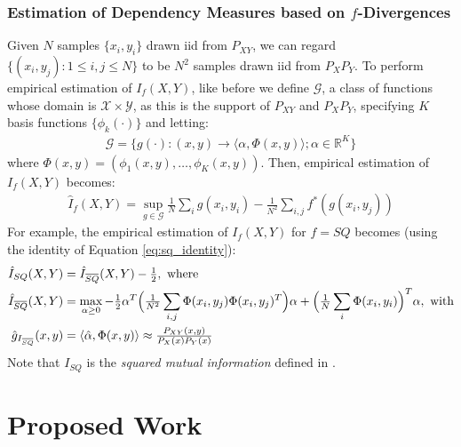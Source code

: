 \documentclass[8pt]{article}
\newcommand{\overbar}[1]{\mkern 1.0mu\overline{\mkern-1.0mu#1\mkern-1.0mu}\mkern 1.0mu}
\begin{document}
\subsubsection{Estimation of Dependency Measures based on
  $f$-Divergences}
Given $N$ samples $\{x_i,y_i\}$ drawn iid from $
P_{XY}$, we can regard $\{(x_i,y_j): 1\leq i,j \leq N\}$ to be $N^2$
samples drawn iid from $P_XP_Y$.  To perform empirical estimation of
$I_f(X,Y)$, like before we define $\mathcal{G}$, a class of functions whose domain is
$\mathcal{X}\times\mathcal{Y}$, as this is the support of $P_{XY}$ and
$P_XP_Y$, specifying $K$ basis functions $\{\phi_k(\cdot)\}$
and letting:
\begin{align}
\mathcal{G} = \{g(\cdot):(x,y)\rightarrow  \langle\alpha, \Phi(x,y)\rangle; \alpha \in \mathbb{R}^K\}\label{eq:I_f_basis}
\end{align}
where $\Phi(x,y)=(\phi_1(x,y),\dots,\phi_K(x,y))$.  Then, empirical estimation of $I_f(X,Y)$
becomes:
\begin{align}
\hat{I}_f(X,Y) = \sup_{g\in\mathcal{G}}\tfrac{1}{N} \sum_i g(x_i,y_i)
- \tfrac{1}{N^2} \sum_{i,j}f^*(g(x_i,y_j))
\end{align}
For example, the empirical estimation of $I_{f}(X,Y)$ for $f=SQ$
becomes (using the identity of Equation \ref{eq:sq_identity}):
\begin{align}
\hat{I}_{SQ}(X,Y) &= \hat{I}_{\overbar{SQ}}(X,Y) - \tfrac{1}{2},\ \text{where}\\
\hat{I}_{\overbar{SQ}}(X,Y)&=\max_{\alpha\geq 0}-\tfrac{1}{2}\alpha^T\Big(\tfrac{1}{N^2}\sum_{i,j}
\Phi(x_i,y_j)\Phi(x_i,y_j)^T\Big)\alpha+\Big(\tfrac{1}{N}\sum_i\Phi(x_i,y_i)\Big)^T\alpha,\
\text{with}\\
\hat{g}_{I_{\overbar{SQ}}}(x,y)&=\langle \hat{\alpha},\Phi(x,y)\rangle \approx \tfrac{P_{XY}(x,y)}{P_X(x)P_Y(x)}
\end{align}
Note that $I_{SQ}$ is the \emph{squared mutual information} defined in \cite{suzuki2013sufficient}.

\section{Proposed Work}
\end{document}
